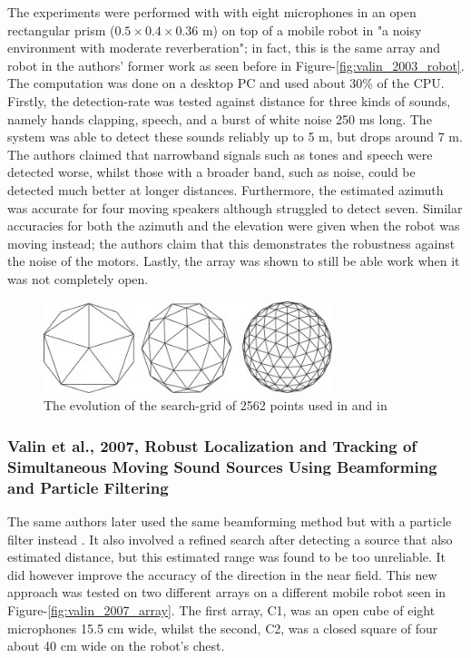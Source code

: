 \documentclass[notitlepage]{report}
\begin{document}
The experiments were performed with with eight microphones in an open rectangular prism ($0.5\times 0.4\times 0.36$ \si{m}) on top of a mobile robot in "a noisy environment with moderate reverberation"; in fact, this is the same array and robot in the authors' former work \cite{valin_robust_2003} as seen before in Figure-\ref{fig:valin_2003_robot}. The computation was done on a desktop PC and used about 30\% of the CPU. Firstly, the detection-rate was tested against distance for three kinds of sounds, namely hands clapping, speech, and a burst of white noise 250 \si{ms} long. The system was able to detect these sounds reliably up to 5 \si{m}, but drops around 7 \si{m}. The authors claimed that narrowband signals such as tones and speech were detected worse, whilst those with a broader band, such as noise, could be detected much better at longer distances. Furthermore, the estimated azimuth was accurate for four moving speakers although struggled to detect seven. Similar accuracies for both the azimuth and the elevation were given when the robot was moving instead; the authors claim that this demonstrates the robustness against the noise of the motors. Lastly, the array was shown to still be able work when it was not completely open.

\begin{figure}[H]
\includegraphics[width=0.75\textwidth]{./valin_2007/grid.jpg}
\centering
\caption{The evolution of the search-grid of 2562 points used in \cite{valin_robust_2003} and in \cite{valin_robust_2007}}
\label{fig:valin_2007_grid}
\centering
\end{figure}

\subsubsection{Valin et al., 2007, Robust Localization and Tracking of Simultaneous Moving Sound Sources Using Beamforming and Particle Filtering}

The same authors later used the same beamforming method but with a particle filter instead \cite{valin_robust_2007}. It also involved a refined search after detecting a source that also estimated distance, but this estimated range was found to be too unreliable. It did however improve the accuracy of the direction in the near field. This new approach was tested on two different arrays on a different mobile robot seen in Figure-\ref{fig:valin_2007_array}. The first array, C1, was an open cube of eight microphones 15.5 \si{cm} wide, whilst the second, C2, was a closed square of four about 40 \si{cm} wide on the robot's chest. 
\end{document}
